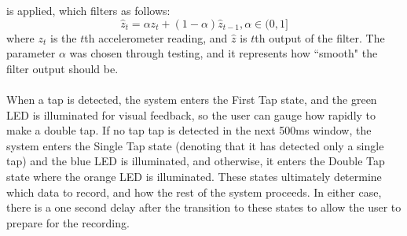 is applied, which filters as follows:
\begin{equation}
	\hat{z}_{t} = \alpha z_{t} + (1-\alpha)\hat{z}_{t-1}, \alpha\in(0,1]
\end{equation}
where $z_t$ is the $t$th accelerometer reading, and $\hat{z}$ is $t$th output of the filter. The
parameter $\alpha$ was chosen through testing, and it represents how ``smooth" the filter output
should be.\\\\
When a tap is detected, the system enters the First Tap state, and the green LED is illuminated for
visual feedback, so the user can gauge how rapidly to make a double tap. If no tap tap is detected
in the next 500ms window, the system enters the Single Tap state (denoting that it has detected only
a single tap) and the blue LED is illuminated, and otherwise, it enters the Double Tap state where
the orange LED is illuminated. These states ultimately determine
which data to record, and how the rest of the system proceeds. In either case, there is a one second
delay after the transition to these states to allow the user to prepare for the recording.
